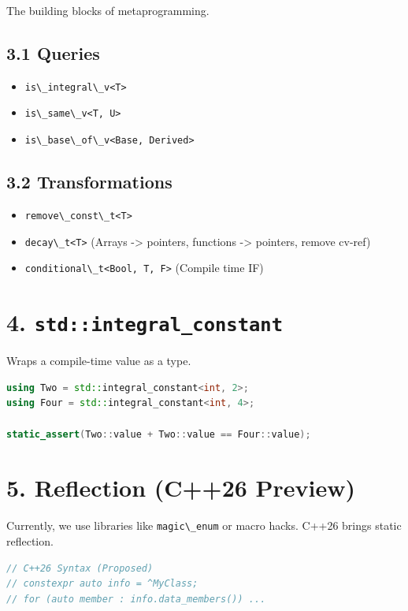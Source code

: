 The building blocks of metaprogramming.

\hypertarget{queries}{%
\subsection{3.1 Queries}\label{queries}}

\begin{itemize}
\tightlist
\item
  \passthrough{\lstinline!is\_integral\_v<T>!}
\item
  \passthrough{\lstinline!is\_same\_v<T, U>!}
\item
  \passthrough{\lstinline!is\_base\_of\_v<Base, Derived>!}
\end{itemize}

\hypertarget{transformations}{%
\subsection{3.2 Transformations}\label{transformations}}

\begin{itemize}
\tightlist
\item
  \passthrough{\lstinline!remove\_const\_t<T>!}
\item
  \passthrough{\lstinline!decay\_t<T>!} (Arrays -\textgreater{}
  pointers, functions -\textgreater{} pointers, remove cv-ref)
\item
  \passthrough{\lstinline!conditional\_t<Bool, T, F>!} (Compile time IF)
\end{itemize}

\hypertarget{stdintegral_constant}{%
\section{\texorpdfstring{4.
\texttt{std::integral\_constant}}{4. std::integral\_constant}}\label{stdintegral_constant}}

Wraps a compile-time value as a type.

\begin{lstlisting}[language={C++}]
using Two = std::integral_constant<int, 2>;
using Four = std::integral_constant<int, 4>;

static_assert(Two::value + Two::value == Four::value);
\end{lstlisting}

\hypertarget{reflection-c26-preview}{%
\section{5. Reflection (C++26 Preview)}\label{reflection-c26-preview}}

Currently, we use libraries like \passthrough{\lstinline!magic\_enum!}
or macro hacks. C++26 brings static reflection.

\begin{lstlisting}[language={C++}]
// C++26 Syntax (Proposed)
// constexpr auto info = ^MyClass;
// for (auto member : info.data_members()) ...
\end{lstlisting}
